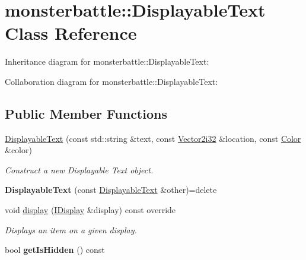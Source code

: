 \hypertarget{classmonsterbattle_1_1DisplayableText}{}\section{monsterbattle\+:\+:Displayable\+Text Class Reference}
\label{classmonsterbattle_1_1DisplayableText}


Inheritance diagram for monsterbattle\+:\+:Displayable\+Text\+:


Collaboration diagram for monsterbattle\+:\+:Displayable\+Text\+:
\subsection*{Public Member Functions}
\begin{DoxyCompactItemize}
\item 
\hyperlink{classmonsterbattle_1_1DisplayableText_ac900c6f68dba204ffa012446e72b66b2}{Displayable\+Text} (const std\+::string \&text, const \hyperlink{structmonsterbattle_1_1Vector}{Vector2i32} \&location, const \hyperlink{structmonsterbattle_1_1Color}{Color} \&color)
\begin{DoxyCompactList}\small\item\em Construct a new Displayable Text object. \end{DoxyCompactList}\item 
\mbox{\label{classmonsterbattle_1_1DisplayableText_a1cd5528b5c35cfe36f76aa7607b0c64c}} 
{\bfseries Displayable\+Text} (const \hyperlink{classmonsterbattle_1_1DisplayableText}{Displayable\+Text} \&other)=delete
\item 
void \hyperlink{classmonsterbattle_1_1DisplayableText_a72ae86bced600e25c38ecceb2867e881}{display} (\hyperlink{structmonsterbattle_1_1IDisplay}{I\+Display} \&display) const override
\begin{DoxyCompactList}\small\item\em Displays an item on a given display. \end{DoxyCompactList}\item 
\mbox{\label{classmonsterbattle_1_1DisplayableText_a901017f236be5bf90248c77868365d32}} 
bool {\bfseries get\+Is\+Hidden} () const
\item 
\mbox{\label{classmonsterbattle_1_1DisplayableText_a582ba3ac5c78c5a71dd847ab31b3f8da}} 

\end{DoxyCompactItemize}
